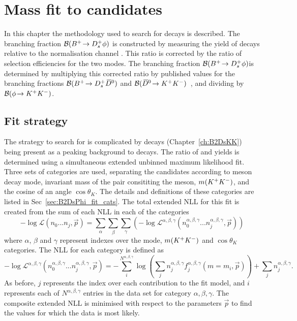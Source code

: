 \chapter{Mass fit to \decay{\Bp}{\Dsp\phiz} candidates} 
\label{ch:B2DsPhi}

\minitoc

In this chapter the methodology used to search for \decay{\Bp}{\Dsp\phiz} decays is described.
The branching fraction ${\mathcal{B}}({{{B}^+}}\!\rightarrow {\ensuremath{{D}^+_{s}}}\phi)$ is constructed by measuring the yield of \decay{\Bp}{\Dsp\phiz} decays relative to the normalisation channel \decay{\Bp}{\Dsp\Dzb}. This ratio is corrected by the ratio of selection efficiencies for the two modes. 
The branching fraction ${\mathcal{B}}({{{B}^+}}\!\rightarrow {\ensuremath{{D}^+_{s}}}\phi)$is determined by multiplying this corrected ratio by published values for the branching fractions ${\mathcal{B}}({{{B}^+}}\!\rightarrow {\ensuremath{{D}^+_{s}}}{\ensuremath{{\kern 0.2em\overline{\kern -0.2em D}{}}{}^0}})$ and ${\mathcal{B}}({{\kern 0.2em\overline{\kern -0.2em D}{}}{}^0}\!\rightarrow {\ensuremath{{K}^+}}{\ensuremath{{K}^-}})$~\cite{PDG2016}, and dividing by ${\mathcal{B}}(\phi\!\rightarrow {\ensuremath{{K}^+}}{\ensuremath{{K}^-}})$. 


\section{Fit strategy}
\label{sec:B2DsPhi_fitstrategy}
The strategy to search for \decay{\Bp}{\Dsp\phiz} is complicated by \decay{\Bp}{\Dsp\Kp\Km} decays (Chapter~\ref{ch:B2DsKK}) being present as a peaking background to \decay{\Bp}{\Dsp(\decay{\phiz}{\Kp\Km})} decays.
The ratio of \decay{\Bp}{\Dsp\phiz} and \decay{\Bp}{\Dsp\Dzb} yields is determined using a simultaneous extended unbinned maximum likelihood fit. Three sets of categories are used, separating the candidates according to \Dsp meson decay mode, invariant mass of the \Kp\Km pair consititing the \phiz meson, $m({{K}^+}{{K}^-})$, and the cosine of an angle $\cos\theta_{K}$. The details and definitions of these categories are listed in Sec~\ref{sec:B2DsPhi_fit_cats}. 
The total extended NLL for this fit is created from the sum of each NLL in each of the categories
\begin{equation}
-\log\mathcal{L}(n_{0}...n_{j},\vec{p}) = \sum_{\alpha} \sum_{\beta} \sum_{\gamma} \left(-\log\mathcal{L^{\alpha,\beta,\gamma}}(n_{0}^{\alpha,\beta,\gamma}...n_{j}^{\alpha,\beta,\gamma},\vec{p}) \right)
\end{equation} 
where $\alpha$, $\beta$ and $\gamma$ represent indexes over the \Dsp mode, $m({{K}^+}{{K}^-})$ and $\cos\theta_{K}$ categories.
The NLL for each category is defined as
\begin{equation}
-\log\mathcal{L^{\alpha,\beta,\gamma}}(n_{0}^{\alpha,\beta,\gamma}...n_{j}^{\alpha,\beta,\gamma},\vec{p}) = -\sum_{i}^{N^{\alpha,\beta,\gamma}} \log \left( \sum_{j} n_{j}^{\alpha,\beta,\gamma} f_{j}^{\alpha,\beta,\gamma}(m=m_{i},\vec{p}) \right) + \sum_{j}n_{j}^{\alpha,\beta,\gamma}.
\end{equation} 
As before, $j$ represents the index over each contribution to the fit model, and $i$ represents each of $N^{\alpha,\beta,\gamma}$ entries in the data set for category $\alpha,\beta,\gamma$. 
The composite extended NLL is minimised with respect to the parameters $\vec{p}$ to find the values for which the data is most likely.

